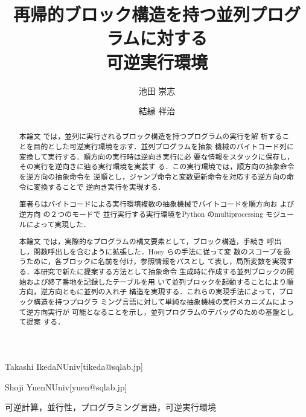 \documentclass[submit,PRO]{ipsj}
\begin{document}
\title{再帰的ブロック構造を持つ並列プログラムに対する\\
      可逆実行環境}





\author{池田 崇志}{Takashi Ikeda}{NUniv}[tikeda@sqlab.jp]
\author{結縁 祥治}{Shoji Yuen}{NUniv}[yuen@sqlab.jp]


\begin{abstract}
本論文%
では，並列に実行されるブロック構造を持つプログラムの実行を解
析することを目的とした可逆実行環境を示す．並列プログラムを抽象
機械のバイトコード列に変換して実行する．順方向の実行時は逆向き実行に必
要な情報をスタックに保存し，その実行を逆向きに辿る実行環境を実装す
る．この実行環境では，順方向の抽象命令を逆方向の抽象命令を
逆順とし，ジャンプ命令と変数更新命令を対応する逆方向の命令に変換することで
逆向き実行を実現する．

筆者らはバイトコードによる実行環境複数の抽象機械でバイトコードを順方向お
よび逆方向%
の２つのモードで%
並行実行する実行環境をPython のmultiprocessing モジュー
ルによって実現した．

本論文%
では，実際的なプログラムの構文要素として，ブロック構造，手続き
呼出し，関数呼出しを含むように拡張した．Hoey らの手法に従って変
数のスコープを扱うために，各ブロックに名前を付け，参照情報をパスとし
て表し，局所変数を実現する．本研究で新たに提案する方法として抽象命令
生成時に作成する並列ブロックの開始および終了番地を記録したテーブルを用
いて並列ブロックを起動することにより順方向，逆方向ともに並列の入れ子
構造を実現する．これらの実現手法によって，ブロック構造を持つプログラ
ミング言語に対して単純な抽象機械の実行メカニズムによって逆方向実行が
可能となることを示し，並列プログラムのデバッグのための基盤として提案
する．
\end{abstract}


\begin{jkeyword}
可逆計算，並行性，プログラミング言語，可逆実行環境
\end{jkeyword}
\end{document}
